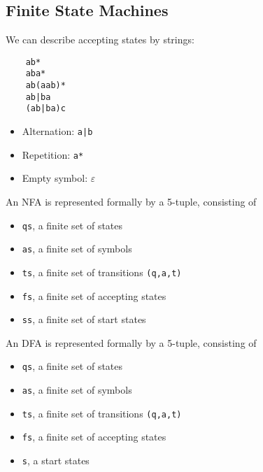 \documentclass{article}
\begin{document}
\subsection{Finite State Machines}
We can describe accepting states by strings:
\begin{verbatim}
    ab*
    aba*
    ab(aab)*
    ab|ba
    (ab|ba)c
\end{verbatim}
\begin{itemize}
	\item Alternation: \texttt{a|b}
	\item Repetition: \texttt{a*}
	\item Empty symbol: $\varepsilon$
\end{itemize}
\begin{definition}
	An NFA is represented formally by a 5-tuple, consisting of
	\begin{itemize}
		\item \texttt{qs}, a finite set of states
		\item \texttt{as}, a finite set of symbols
		\item \texttt{ts}, a finite set of transitions \texttt{(q,a,t)}
		\item \texttt{fs}, a finite set of accepting states
		\item \texttt{ss}, a finite set of start states
	\end{itemize}
\end{definition}
\begin{definition}
	An DFA is represented formally by a 5-tuple, consisting of
	\begin{itemize}
		\item \texttt{qs}, a finite set of states
		\item \texttt{as}, a finite set of symbols
		\item \texttt{ts}, a finite set of transitions \texttt{(q,a,t)}
		\item \texttt{fs}, a finite set of accepting states
		\item \texttt{s}, a start states
	\end{itemize}
\end{definition}
\end{document}
